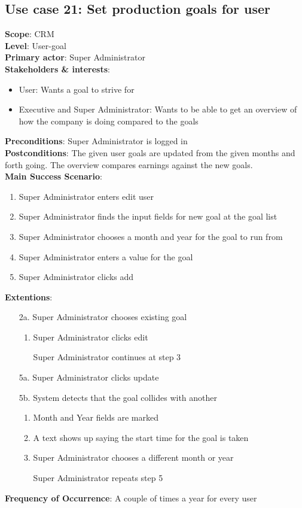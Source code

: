 \subsection{Use case 21: Set production goals for user}
\textbf{Scope}: CRM \\
\textbf{Level}: User-goal \\
\textbf{Primary actor}: Super Administrator \\
\textbf{Stakeholders \& interests}:
\begin{itemize}
  \item User: Wants a goal to strive for
  \item Executive and Super Administrator: Wants to be able to get an overview of how the company is doing compared to the goals
\end{itemize}
\textbf{Preconditions}: Super Administrator is logged in \\
\textbf{Postconditions}: The given user goals are updated from the given months and forth going. The overview compares earnings against the new goals.\\
\textbf{Main Success Scenario}:
\begin{enumerate}
  \item Super Administrator enters edit user
  \item Super Administrator finds the input fields for new goal at the goal list
  \item Super Administrator chooses a month and year for the goal to run from
  \item Super Administrator enters a value for the goal
  \item Super Administrator clicks add
\end{enumerate}
\textbf{Extentions}:
\begin{itemize}
  \item [2a.] Super Administrator chooses existing goal
  \begin{enumerate}
    \item Super Administrator clicks edit
    \item [] Super Administrator continues at step 3
  \end{enumerate}
  \item [5a.] Super Administrator clicks update
  \item [5b.] System detects that the goal collides with another
  \begin{enumerate}
    \item Month and Year fields are marked
    \item A text shows up saying the start time for the goal is taken
    \item Super Administrator chooses a different month or year
    \item [] Super Administrator repeats step 5
  \end{enumerate}
\end{itemize}
\textbf{Frequency of Occurrence}: A couple of times a year for every user

